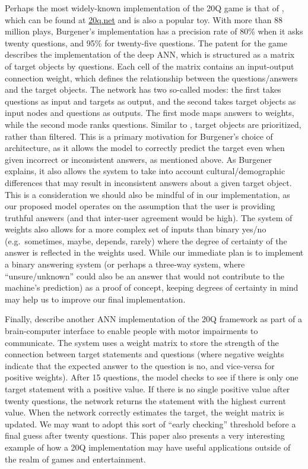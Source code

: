 \documentclass[11pt,a4paper]{article}
\begin{document}
Perhaps the most widely-known implementation of the 20Q game is that of \citet{Burgener2006}, which can be found at \url{20q.net} and is also a popular toy. 
With more than 88 million plays, Burgener's implementation has a precision rate of 80\% when it asks twenty questions, and 95\% for twenty-five questions. 
The patent for the game describes the implementation of the deep ANN, which is structured as a matrix of target objects by questions. 
Each cell of the matrix contains an input-output connection weight, which defines the relationship between the questions/answers and the target objects. 
The network has two so-called modes: the first takes questions as input and targets as output, and the second takes target objects as input nodes and questions as outputs. 
The first mode maps answers to weights, while the second mode ranks questions. 
Similar to \citet{DeyEa2019}, target objects are prioritized, rather than filtered. 
This is a primary motivation for Burgener's choice of architecture, as it allows the model to correctly predict the target even when given incorrect or inconsistent answers, as mentioned above. 
As Burgener explains, it also allows the system to take into account cultural/demographic differences that may result in inconsistent answers about a given target object. 
This is a consideration we should also be mindful of in our implementation, as our proposed model operates on the assumption that the user is providing truthful answers (and that inter-user agreement would be high). 
The system of weights also allows for a more complex set of inputs than binary yes/no (e.g.\ sometimes, maybe, depends, rarely) where the degree of certainty of the answer is reflected in the weights used. 
While our immediate plan is to implement a binary answering system (or perhaps a three-way system, where ``unsure/unknown'' could also be an answer that would not contribute to the machine's prediction) as a proof of concept, keeping degrees of certainty in mind may help us to improve our final implementation.

Finally, \citet{ToninEa2018} describe another ANN implementation of the 20Q framework as part of a brain-computer interface to enable people with motor impairments to communicate. 
The system uses a weight matrix to store the strength of the connection between target statements and questions (where negative weights indicate that the expected answer to the question is no, and vice-versa for positive weights). 
After 15 questions, the model checks to see if there is only one target statement with a positive value. 
If there is no single positive value after twenty questions, the network returns the statement with the highest current value. 
When the network correctly estimates the target, the weight matrix is updated. 
We may want to adopt this sort of ``early checking'' threshold before a final guess after twenty questions. 
This paper also presents a very interesting example of how a 20Q implementation may have useful applications outside of the realm of games and entertainment.
\end{document}
